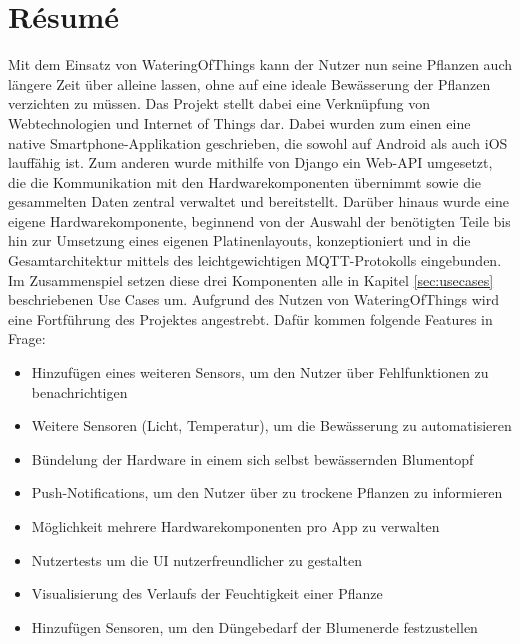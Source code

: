 \section{Résumé}
Mit dem Einsatz von WateringOfThings kann der Nutzer nun seine Pflanzen auch längere Zeit über alleine lassen, ohne auf eine ideale Bewässerung der Pflanzen verzichten zu müssen. Das Projekt stellt dabei eine Verknüpfung von Webtechnologien und Internet of Things dar. Dabei wurden zum einen eine native Smartphone-Applikation geschrieben, die sowohl auf Android als auch iOS lauffähig ist. Zum anderen wurde mithilfe von Django ein Web-API umgesetzt, die die Kommunikation mit den Hardwarekomponenten übernimmt sowie die gesammelten Daten zentral verwaltet und bereitstellt. Darüber hinaus wurde eine eigene Hardwarekomponente, beginnend von der Auswahl der benötigten Teile bis hin zur Umsetzung eines eigenen Platinenlayouts, konzeptioniert und in die Gesamtarchitektur mittels des leichtgewichtigen MQTT-Protokolls eingebunden. Im Zusammenspiel setzen diese drei Komponenten alle in Kapitel \ref{sec:usecases} beschriebenen Use Cases um. Aufgrund des Nutzen von WateringOfThings wird eine Fortführung des Projektes angestrebt. Dafür kommen folgende Features in Frage:
\begin{itemize}
    \item Hinzufügen eines weiteren Sensors, um den Nutzer über Fehlfunktionen zu benachrichtigen
    \item Weitere Sensoren (Licht, Temperatur), um die Bewässerung zu automatisieren
    \item Bündelung der Hardware in einem sich selbst bewässernden Blumentopf
    \item Push-Notifications, um den Nutzer über zu trockene Pflanzen zu informieren
    \item Möglichkeit mehrere Hardwarekomponenten pro App zu verwalten
    \item Nutzertests um die UI nutzerfreundlicher zu gestalten
    \item Visualisierung des Verlaufs der Feuchtigkeit einer Pflanze
    \item Hinzufügen Sensoren, um den Düngebedarf der Blumenerde festzustellen
\end{itemize}

